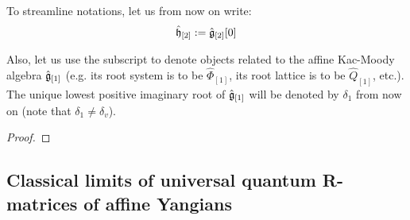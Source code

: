         \begin{convention}
            To streamline notations, let us from now on write:
                $$\hat{\mathfrak{h}}_{[2]} := \hat{\mathfrak{g}}_{[2]}[0]$$
            
            Also, let us use the subscript \say{$[1]$} to denote objects related to the affine Kac-Moody algebra $\hat{\mathfrak{g}}_{[1]}$ (e.g. its root system is to be $\hat{\Phi}_{[1]}$, its root lattice is to be $\hat{Q}_{[1]}$, etc.). The unique lowest positive imaginary root of $\hat{\mathfrak{g}}_{[1]}$ will be denoted by $\delta_1$ from now on (note that $\delta_1 \not = \delta_v$).
        \end{convention}

        \begin{proposition}
            
        \end{proposition}
            \begin{proof}
                
            \end{proof}

        \newpage

    \subsection{Classical limits of universal quantum R-matrices of affine Yangians}